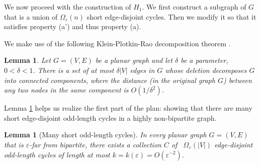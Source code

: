 \documentclass[11pt]{article}
\newtheorem{lemma}[theorem]{Lemma}
\newcommand{\eps}{\ensuremath{\epsilon}}
\def\epsilon{\ensuremath{\varepsilon}}
\begin{document}
We now proceed with the construction of $H_1$. We first construct a subgraph of $G$ that is a union of $\Omega_{\eps}(n)$ short edge-disjoint cycles. Then we modify it so that it satisfies property (a') and thus property (a).

We make use of the following Klein-Plotkin-Rao decomposition theorem \cite{KPR93}.

\begin{lemma}{\rm\textbf{\cite{KPR93}}}
\label{lemma:partition-into-conn-comp-of-small-diam}
Let $G = (V,E)$ be a planar graph and let $\delta$ be a parameter, $0 < \delta < 1$. There is a set of at most $\delta |V|$ edges in $G$ whose deletion decomposes $G$ into connected components, where the distance (in the original graph $G$) between any two nodes in the same component is $O(1/\delta^2)$.
\end{lemma}
Lemma \ref{lemma:partition-into-conn-comp-of-small-diam} helps us realize the first part of the plan: showing that there are many short edge-disjoint odd-length cycles in a highly non-bipartite graph.

\begin{lemma}[Many short odd-length cycles]
\label{lemma:first_reduction}
In every planar graph $G=(V,E)$ that is $\eps$-far from bipartite, there exists a collection $C$ of \ $\Omega_{\eps}(|V|)$ edge-disjoint odd-length cycles of length at most $k=k(\eps)=O(\eps^{-2})$.
\end{lemma}
\end{document}
